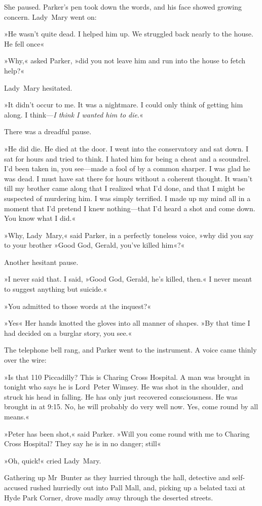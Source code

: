 She paused. Parker's pen took down the words, and his face showed growing concern. Lady~Mary went on:

»He wasn't quite dead. I helped him up. We struggled back nearly to the house. He fell once\longdash«

»Why,« asked Parker, »did you not leave him and run into the house to fetch help?«

Lady~Mary hesitated.

»It didn't occur to me. It was a nightmare. I could only think of getting him along. I think—\textit{I think I wanted him to die}.«

There was a dreadful pause.

»He did die. He died at the door. I went into the conservatory and sat down. I sat for hours and tried to think. I hated him for being a cheat and a scoundrel. I'd been taken in, you see—made a fool of by a common sharper. I was glad he was dead. I must have sat there for hours without a coherent thought. It wasn't till my brother came along that I realized what I'd done, and that I might be suspected of murdering him. I was simply terrified. I made up my mind all in a moment that I'd pretend I knew nothing—that I'd heard a shot and come down. You know what I did.«

»Why, Lady~Mary,« said Parker, in a perfectly toneless voice, »why did you say to your brother »Good God, Gerald, you've killed him«?«

Another hesitant pause.

»I never said that. I said, »Good God, Gerald, he's killed, then.« I never meant to suggest anything but suicide.«

»You admitted to those words at the inquest?«

»Yes\longdash« Her hands knotted the gloves into all manner of shapes. »By that time I had decided on a burglar story, you see.«

The telephone bell rang, and Parker went to the instrument. A voice came thinly over the wire:

»Is that 110 Piccadilly? This is Charing Cross Hospital. A man was brought in tonight who says he is Lord~Peter Wimsey. He was shot in the shoulder, and struck his head in falling. He has only just recovered consciousness. He was brought in at 9:15. No, he will probably do very well now. Yes, come round by all means.«

»Peter has been shot,« said Parker. »Will you come round with me to Charing Cross Hospital? They say he is in no danger; still\longdash«

»Oh, quick!« cried Lady~Mary.

Gathering up Mr~Bunter as they hurried through the hall, detective and self-accused rushed hurriedly out into Pall Mall, and, picking up a belated taxi at Hyde Park Corner, drove madly away through the deserted streets.
